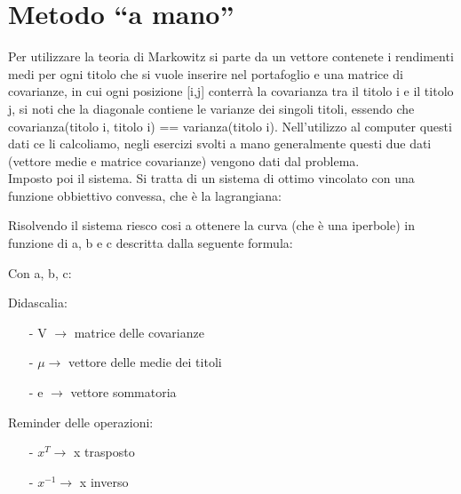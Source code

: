 \vspace{1cm}
\section{Metodo “a mano”}

Per utilizzare la teoria di Markowitz si parte da un vettore contenete i rendimenti medi per ogni titolo che si vuole inserire nel portafoglio e una matrice di covarianze, in cui ogni posizione [i,j] conterrà la covarianza tra il titolo i e il titolo j, si noti che la diagonale contiene le varianze dei singoli titoli, essendo che covarianza(titolo i, titolo i) == varianza(titolo i). Nell’utilizzo al computer questi dati ce li calcoliamo, negli esercizi svolti a mano generalmente questi due dati (vettore medie e matrice covarianze) vengono dati dal problema.\\
Imposto poi il sistema. Si tratta di un sistema di ottimo vincolato con una funzione obbiettivo convessa, che è la lagrangiana:

\noindent
Risolvendo il sistema riesco cosi a ottenere la curva (che è una iperbole) in funzione di a, b e c descritta dalla seguente formula:

Con a, b, c:
\noindent
{}



\begin{Nota}
    Didascalia:
    \begin{enumerate}
        \item[-] V $\rightarrow$ matrice delle covarianze
        \item[-] $\mu \rightarrow$ vettore delle medie dei titoli
        \item[-] e $\rightarrow$ vettore sommatoria\\
    \end{enumerate}

    Reminder delle operazioni:
    \begin{enumerate}
        \item[-] $x^T \rightarrow$ x trasposto
        \item[-] $x^{-1} \rightarrow$ x inverso
    \end{enumerate}
\end{Nota}



